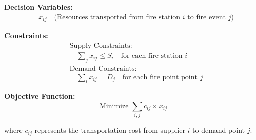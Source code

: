 \documentclass[lettersize,journal]{IEEEtran}
\begin{document}


\textbf{Decision Variables:}
\begin{align}
    & x_{ij} \quad \text{(Resources transported from fire station $i$ to fire event $j$)}
\end{align}

\textbf{Constraints:}
\begin{align}
    & \text{Supply Constraints:} \\
    & \quad \sum_{j} x_{ij} \leq S_i \quad \text{for each fire station $i$} \\
    & \text{Demand Constraints:} \\
    & \quad \sum_{i} x_{ij} = D_j \quad \text{for each fire point point $j$}
\end{align}

\textbf{Objective Function:}
\begin{equation}
    \text{Minimize } \sum_{i,j} c_{ij} \times x_{ij}
\end{equation}

where $c_{ij}$ represents the transportation cost from supplier $i$ to demand point $j$.
\end{document}
